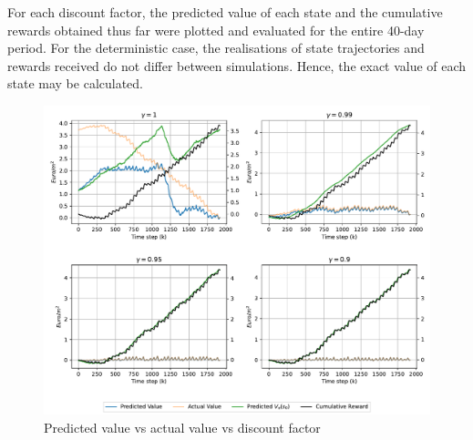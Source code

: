 For each discount factor, the predicted value of each state and the cumulative rewards obtained thus far were plotted and evaluated for the entire 40-day period. For the deterministic case, the realisations of state trajectories and rewards received do not differ between simulations. Hence, the exact value of each state may be calculated. 

\begin{figure}[H]
    \centering
    \includegraphics[width = \textwidth]{figures/vf_vs_gamma.pdf}
    \caption{Predicted value vs actual value vs discount factor}
    \label{fig:vf-vs-gamma}
\end{figure}

